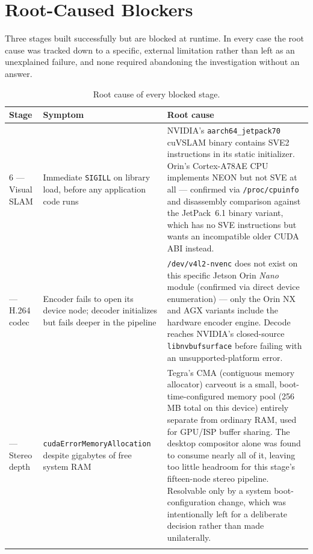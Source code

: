 \documentclass[11pt,a4paper]{article}
\begin{document}
\section{Root-Caused Blockers}
\label{sec:blockers}

Three stages built successfully but are blocked at runtime. In every case
the root cause was tracked down to a specific, external limitation rather
than left as an unexplained failure, and none required abandoning the
investigation without an answer.

\begin{longtable}{@{}p{2.6cm}p{5.6cm}p{6.4cm}@{}}
\toprule
\textbf{Stage} & \textbf{Symptom} & \textbf{Root cause} \\
\midrule
\endhead
6 --- Visual SLAM &
  Immediate \texttt{SIGILL} on library load, before any application code runs &
  NVIDIA's \texttt{aarch64\_jetpack70} cuVSLAM binary contains SVE2 instructions in its static initializer. Orin's Cortex-A78AE CPU implements NEON but not SVE at all --- confirmed via \texttt{/proc/cpuinfo} and disassembly comparison against the JetPack~6.1 binary variant, which has no SVE instructions but wants an incompatible older CUDA ABI instead. \\
\addlinespace
9 --- H.264 codec &
  Encoder fails to open its device node; decoder initializes but fails deeper in the pipeline &
  \texttt{/dev/v4l2-nvenc} does not exist on this specific Jetson Orin \emph{Nano} module (confirmed via direct device enumeration) --- only the Orin NX and AGX variants include the hardware encoder engine. Decode reaches NVIDIA's closed-source \texttt{libnvbufsurface} before failing with an unsupported-platform error. \\
\addlinespace
11 --- Stereo depth &
  \texttt{cudaErrorMemoryAllocation} despite gigabytes of free system RAM &
  Tegra's CMA (contiguous memory allocator) carveout is a small, boot-time-configured memory pool (256\,MB total on this device) entirely separate from ordinary RAM, used for GPU/ISP buffer sharing. The desktop compositor alone was found to consume nearly all of it, leaving too little headroom for this stage's fifteen-node stereo pipeline. Resolvable only by a system boot-configuration change, which was intentionally left for a deliberate decision rather than made unilaterally. \\
\bottomrule
\caption{Root cause of every blocked stage.}
\end{longtable}
\end{document}

